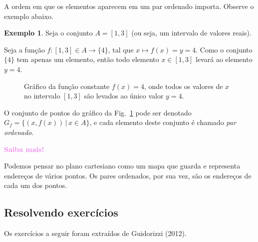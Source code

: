 \documentclass[12pt,openright,twoside,a4paper]{article}
\theoremstyle{definition}
\newtheorem{example}{Exemplo}[section]
\begin{document}
	A ordem em que os elementos aparecem em um par ordenado importa. Observe o exemplo abaixo.
	
	\begin{example}
		Seja o conjunto $A = [1,3]$ (ou seja, um intervalo de valores reais).
		
		Seja a função $f: [1,3] \in A \longrightarrow \{4\}$, tal que $x \mapsto f(x) = y = 4$. Como o conjunto $\{4\}$ tem apenas um elemento, então todo elemento $x \in [1,3]$ levará ao elemento $y=4$.
		
		\begin{figure}[h]
			\centering
			\caption{Gráfico da função constante $f(x) = 4$, onde todos os valores de $x$ no intervalo $[1,3]$ são levados ao único valor $y = 4$.}
			\label{fig:funcao_constante_no_plano}
		\end{figure}
		
		O conjunto de pontos do gráfico da Fig.~\ref{fig:funcao_constante_no_plano} pode ser denotado $G_f = \{ (x, f(x)) \,|\, x \in A\}$, e cada elemento deste conjunto é chamado \textit{par ordenado}.
	\end{example}
	
	\begin{snugshade}
		\textbf{\textcolor{violet}{Saiba mais!}}
		
		Podemos pensar no plano cartesiano como um mapa que guarda e representa endereços de vários pontos. Os pares ordenados, por sua vez, são os endereços de cada um dos pontos.
	\end{snugshade}
	
	
	\subsection{Resolvendo exercícios}
	Os exercícios a seguir foram extraídos de Guidorizzi (2012).
	
\end{document}
